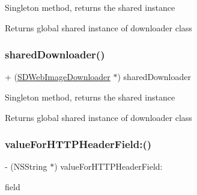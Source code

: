 Singleton method, returns the shared instance

\begin{DoxyReturn}{Returns}
global shared instance of downloader class 
\end{DoxyReturn}
\mbox{\label{interface_s_d_web_image_downloader_a3611251a4eebd50128610c79d48aadca}} 
\subsubsection{\texorpdfstring{shared\+Downloader()}{sharedDownloader()}\hspace{0.1cm}{\footnotesize\ttfamily [3/3]}}
{\footnotesize\ttfamily + (\mbox{\hyperlink{interface_s_d_web_image_downloader}{S\+D\+Web\+Image\+Downloader}} $\ast$) shared\+Downloader \begin{DoxyParamCaption}{ }\end{DoxyParamCaption}}

Singleton method, returns the shared instance

\begin{DoxyReturn}{Returns}
global shared instance of downloader class 
\end{DoxyReturn}
\mbox{\label{interface_s_d_web_image_downloader_a35c47c9cf43fbce253153417f5f9f2f4}} 
\subsubsection{\texorpdfstring{value\+For\+H\+T\+T\+P\+Header\+Field\+:()}{valueForHTTPHeaderField:()}\hspace{0.1cm}{\footnotesize\ttfamily [1/3]}}
{\footnotesize\ttfamily -\/ (N\+S\+String $\ast$) value\+For\+H\+T\+T\+P\+Header\+Field\+: \begin{DoxyParamCaption}\item[{(N\+S\+String $\ast$)}]{field }\end{DoxyParamCaption}}

